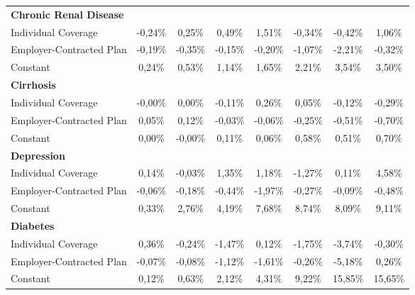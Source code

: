 \documentclass{article}
\begin{document}
\begin{table*}
{\begin{tabular}{l*{7}{c}}
\midrule
\textbf{Chronic Renal Disease} & & & & & & & \\

Individual Coverage &  -0,24\%\sym{**} &   0,25\%  &   0,49\%  &   1,51\%  &  -0,34\%  &  -0,42\%  &   1,06\% \\
Employer-Contracted Plan&  -0,19\%\sym{*}  &  -0,35\%  &  -0,15\%  &  -0,20\%  &  -1,07\%  &  -2,21\%\sym{*}  &  -0,32\% \\
Constant            &   0,24\%\sym{**} &   0,53\%\sym{***}&   1,14\%\sym{***}&   1,65\%\sym{***}&   2,21\%\sym{***}&   3,54\%\sym{***}&   3,50\%\sym{***}\\

\midrule
\textbf{Cirrhosis} & & & & & & & \\

Individual Coverage &  -0,00\%  &   0,00\%  &  -0,11\%  &   0,26\%  &   0,05\%  &  -0,12\%  &  -0,29\% \\
Employer-Contracted Plan&   0,05\%  &   0,12\%  &  -0,03\%  &  -0,06\%  &  -0,25\%  &  -0,51\%  &  -0,70\% \\
Constant            &   0,00\%  &  -0,00\%  &   0,11\%  &   0,06\%  &   0,58\%\sym{*}  &   0,51\%  &   0,70\% \\


\midrule
\textbf{Depression} & & & & & & & \\

Individual Coverage &   0,14\%  &  -0,03\%  &   1,35\%  &   1,18\%  &  -1,27\%  &   0,11\%  &   4,58\% \\
Employer-Contracted Plan&  -0,06\%  &  -0,18\%  &  -0,44\%  &  -1,97\%\sym{*}  &  -0,27\%  &  -0,09\%  &  -0,48\% \\
Constant            &   0,33\%\sym{***}&   2,76\%\sym{***}&   4,19\%\sym{***}&   7,68\%\sym{***}&   8,74\%\sym{***}&   8,09\%\sym{***}&   9,11\%\sym{***}\\

\midrule
\textbf{Diabetes} & & & & & & & \\

Individual Coverage &   0,36\%  &  -0,24\%  &  -1,47\%\sym{*}  &   0,12\%  &  -1,75\%  &  -3,74\%  &  -0,30\% \\
Employer-Contracted Plan&  -0,07\%  &  -0,08\%  &  -1,12\%\sym{*}  &  -1,61\%\sym{*}  &  -0,26\%  &  -5,18\%\sym{*}  &   0,26\% \\
Constant            &   0,12\%\sym{*}  &   0,63\%\sym{***}&   2,12\%\sym{***}&   4,31\%\sym{***}&   9,22\%\sym{***}&  15,85\%\sym{***}&  15,65\%\sym{***}\\


\end{tabular}}
\end{table*}
\end{document}
